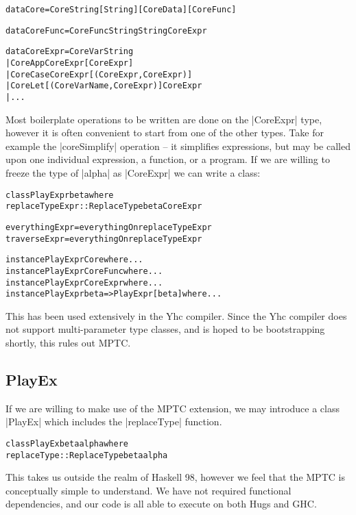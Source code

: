 \documentclass[preprint]{sigplanconf}
\newenvironment{code}{\begin{alltt}\small}{\end{alltt}}
\begin{document}
\begin{code}
data Core = Core String [String] [CoreData] [CoreFunc]

data CoreFunc = CoreFunc String String CoreExpr

data CoreExpr  =  CoreVar   String
               |  CoreApp   CoreExpr  [CoreExpr]
               |  CoreCase  CoreExpr  [(CoreExpr, CoreExpr)]
               |  CoreLet   [(CoreVarName, CoreExpr)] CoreExpr
               |  ...
\end{code}

Most boilerplate operations to be written are done on the |CoreExpr| type, however it is often convenient to start from one of the other types. Take for example the |coreSimplify| operation -- it simplifies expressions, but may be called upon one individual expression, a function, or a program. If we are willing to freeze the type of |alpha| as |CoreExpr| we can write a class:

\begin{code}
class  PlayExpr beta where
       replaceTypeExpr :: ReplaceType beta CoreExpr

everythingExpr = everythingOn replaceTypeExpr
traverseExpr = everythingOn replaceTypeExpr

instance PlayExpr Core where ...
instance PlayExpr CoreFunc where ...
instance PlayExpr CoreExpr where ...
instance PlayExpr beta => PlayExpr [beta] where ...
\end{code}

This has been used extensively in the Yhc compiler. Since the Yhc compiler does not support multi-parameter type classes, and is hoped to be bootstrapping shortly, this rules out MPTC.

\subsection{PlayEx}

If we are willing to make use of the MPTC extension, we may introduce a class |PlayEx| which includes the |replaceType| function.

\begin{code}
class  PlayEx beta alpha where
       replaceType :: ReplaceType beta alpha
\end{code}

This takes us outside the realm of Haskell 98, however we feel that the MPTC is conceptually simple to understand. We have not required functional dependencies, and our code is all able to execute on both Hugs and GHC.
\end{document}
